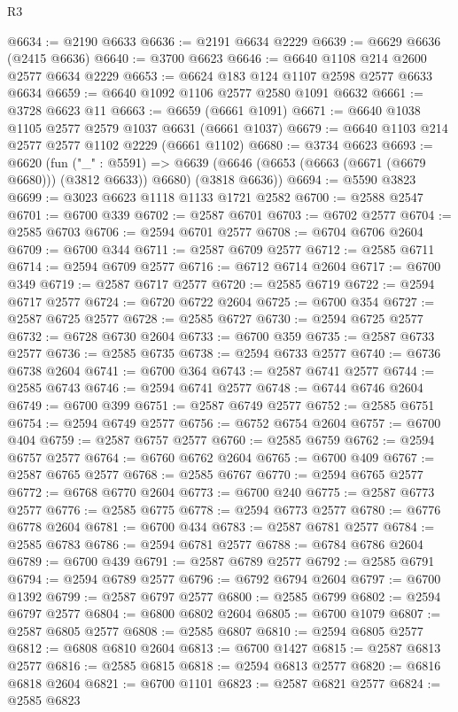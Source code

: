 \begin{lexlean}{R3}
\begin{coremodule}
@6634 := @2190 @6633
@6636 := @2191 @6634 @2229
@6639 := @6629 @6636 (@2415 @6636)
@6640 := @3700 @6623
@6646 := @6640 @1108 @214 @2600 @2577 @6634 @2229
@6653 := @6624 @183 @124 @1107 @2598 @2577 @6633 @6634
@6659 := @6640 @1092 @1106 @2577 @2580 @1091 @6632
@6661 := @3728 @6623 @11
@6663 := @6659 (@6661 @1091)
@6671 := @6640 @1038 @1105 @2577 @2579 @1037 @6631 (@6661 @1037)
@6679 := @6640 @1103 @214 @2577 @2577 @1102 @2229 (@6661 @1102)
@6680 := @3734 @6623
@6693 := @6620
    (fun ("_" : @5591) =>
    @6639 (@6646 (@6653 (@6663 (@6671 (@6679 @6680))) (@3812 @6633)) @6680) (@3818 @6636))
@6694 := @5590 @3823
@6699 := @3023 @6623 @1118 @1133 @1721 @2582
@6700 := @2588 @2547
@6701 := @6700 @339
@6702 := @2587 @6701
@6703 := @6702 @2577
@6704 := @2585 @6703
@6706 := @2594 @6701 @2577
@6708 := @6704 @6706 @2604
@6709 := @6700 @344
@6711 := @2587 @6709 @2577
@6712 := @2585 @6711
@6714 := @2594 @6709 @2577
@6716 := @6712 @6714 @2604
@6717 := @6700 @349
@6719 := @2587 @6717 @2577
@6720 := @2585 @6719
@6722 := @2594 @6717 @2577
@6724 := @6720 @6722 @2604
@6725 := @6700 @354
@6727 := @2587 @6725 @2577
@6728 := @2585 @6727
@6730 := @2594 @6725 @2577
@6732 := @6728 @6730 @2604
@6733 := @6700 @359
@6735 := @2587 @6733 @2577
@6736 := @2585 @6735
@6738 := @2594 @6733 @2577
@6740 := @6736 @6738 @2604
@6741 := @6700 @364
@6743 := @2587 @6741 @2577
@6744 := @2585 @6743
@6746 := @2594 @6741 @2577
@6748 := @6744 @6746 @2604
@6749 := @6700 @399
@6751 := @2587 @6749 @2577
@6752 := @2585 @6751
@6754 := @2594 @6749 @2577
@6756 := @6752 @6754 @2604
@6757 := @6700 @404
@6759 := @2587 @6757 @2577
@6760 := @2585 @6759
@6762 := @2594 @6757 @2577
@6764 := @6760 @6762 @2604
@6765 := @6700 @409
@6767 := @2587 @6765 @2577
@6768 := @2585 @6767
@6770 := @2594 @6765 @2577
@6772 := @6768 @6770 @2604
@6773 := @6700 @240
@6775 := @2587 @6773 @2577
@6776 := @2585 @6775
@6778 := @2594 @6773 @2577
@6780 := @6776 @6778 @2604
@6781 := @6700 @434
@6783 := @2587 @6781 @2577
@6784 := @2585 @6783
@6786 := @2594 @6781 @2577
@6788 := @6784 @6786 @2604
@6789 := @6700 @439
@6791 := @2587 @6789 @2577
@6792 := @2585 @6791
@6794 := @2594 @6789 @2577
@6796 := @6792 @6794 @2604
@6797 := @6700 @1392
@6799 := @2587 @6797 @2577
@6800 := @2585 @6799
@6802 := @2594 @6797 @2577
@6804 := @6800 @6802 @2604
@6805 := @6700 @1079
@6807 := @2587 @6805 @2577
@6808 := @2585 @6807
@6810 := @2594 @6805 @2577
@6812 := @6808 @6810 @2604
@6813 := @6700 @1427
@6815 := @2587 @6813 @2577
@6816 := @2585 @6815
@6818 := @2594 @6813 @2577
@6820 := @6816 @6818 @2604
@6821 := @6700 @1101
@6823 := @2587 @6821 @2577
@6824 := @2585 @6823

\end{coremodule}
\end{lexlean}
